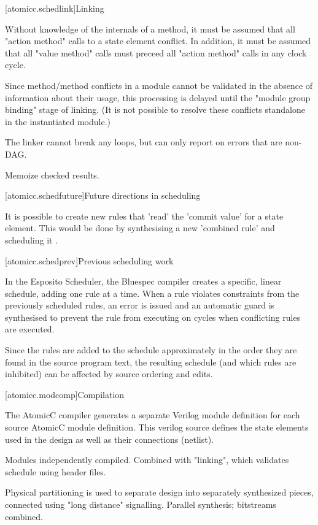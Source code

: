 [atomicc.schedlink]{Linking}

Without knowledge of the internals of a method, it must be assumed that all "action method"
calls to a state element conflict.  In addition, it must be assumed that all "value method" calls
must preceed all "action method" calls in any clock cycle.

Since method/method conflicts in a module cannot be validated in the absence of
information about their usage, this processing is delayed until the "module group binding"
stage of linking.
(It is not possible to resolve these conflicts standalone in the instantiated module.)

The linker cannot break any loops, but can only report on errors that are non-DAG.

Memoize checked results.

[atomicc.schedfuture]{Future directions in scheduling}

It is possible to create new rules that 'read' the 'commit value' for a state element.
This would be done by synthesising a new 'combined rule' and scheduling it \cite{Rosenband:Thesis}.

[atomicc.schedprev]{Previous scheduling work}

In the Esposito Scheduler\cite{Esposito:Patent},
the Bluespec compiler creates a specific, linear schedule, adding
one rule at a time.  When a rule violates constraints from the previously scheduled
rules, an error is issued and an automatic guard is synthesised to prevent the
rule from executing on cycles when conflicting rules are executed.

Since the rules are added to the schedule approximately in the order they are
found in the source program text, the resulting schedule (and which rules are
inhibited) can be affected by source ordering and edits.

[atomicc.modcomp]{Compilation}

The AtomicC compiler generates a separate Verilog module definition
for each source AtomicC module definition.
This verilog source defines the state elements
used in the design as well as their connections (netlist).

Modules independently compiled.  Combined with "linking", which validates schedule using header files.

Physical partitioning is used to separate design into separately synthesized pieces, connected using
"long distance" signalling.  Parallel synthesis; bitstreams combined.

